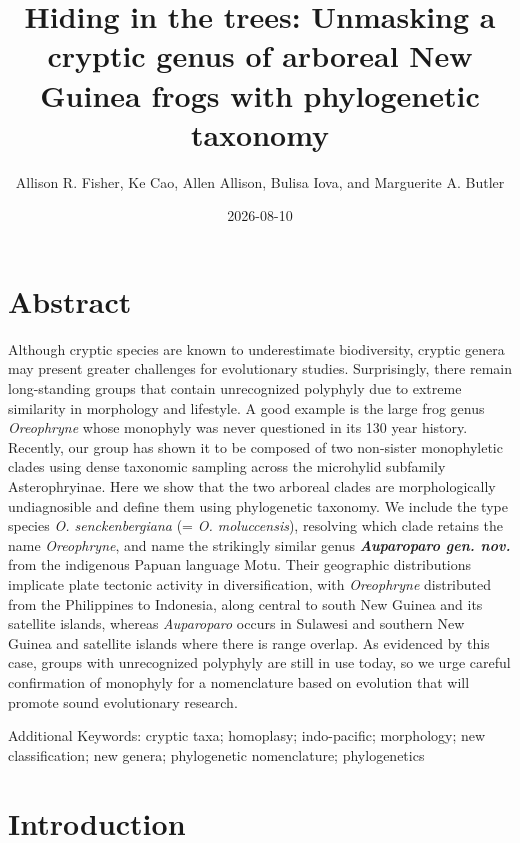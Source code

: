 \documentclass[
  letterpaper,
  DIV=11,
  numbers=noendperiod]{scrartcl}
\title{Hiding in the trees: Unmasking a cryptic genus of arboreal New
Guinea frogs with phylogenetic taxonomy}
\author{Allison R. Fisher, Ke Cao, Allen Allison, Bulisa Iova, and
Marguerite A. Butler}
\date{2026-08-10}
\begin{document}
\maketitle


\newpage{}

\section{Abstract}\label{abstract}

Although cryptic species are known to underestimate biodiversity,
cryptic genera may present greater challenges for evolutionary studies.
Surprisingly, there remain long-standing groups that contain
unrecognized polyphyly due to extreme similarity in morphology and
lifestyle. A good example is the large frog genus \emph{Oreophryne}
whose monophyly was never questioned in its 130 year history. Recently,
our group has shown it to be composed of two non-sister monophyletic
clades using dense taxonomic sampling across the microhylid subfamily
Asterophryinae. Here we show that the two arboreal clades are
morphologically undiagnosible and define them using phylogenetic
taxonomy. We include the type species \emph{O. senckenbergiana} (=
\emph{O. moluccensis}), resolving which clade retains the name
\emph{Oreophryne}, and name the strikingly similar genus
\textbf{\emph{Auparoparo gen. nov.}} from the indigenous Papuan language
Motu. Their geographic distributions implicate plate tectonic activity
in diversification, with \emph{Oreophryne} distributed from the
Philippines to Indonesia, along central to south New Guinea and its
satellite islands, whereas \emph{Auparoparo} occurs in Sulawesi and
southern New Guinea and satellite islands where there is range overlap.
As evidenced by this case, groups with unrecognized polyphyly are still
in use today, so we urge careful confirmation of monophyly for a
nomenclature based on evolution that will promote sound evolutionary
research.

Additional Keywords: cryptic taxa; homoplasy; indo-pacific; morphology;
new classification; new genera; phylogenetic nomenclature; phylogenetics

\newpage{}

\section{Introduction}\label{introduction}
\end{document}
